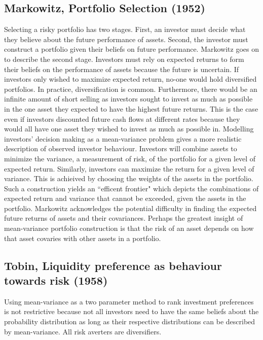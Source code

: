 \subsection[Markowitz, 1952]{Markowitz, Portfolio Selection
(1952)\cite{markowitz1952portfolio}}

Selecting a risky portfolio has two stages. First, an investor must decide what they
believe about the future performance of assets. Second, the investor must construct a
portfolio given their beliefs on future performance. Markowitz goes on to describe the
second stage. Investors must rely on expected returns to form their beliefs on the
performance of assets because the future is uncertain. If investors only wished to
maximize expected return, no-one would hold diversified portfolios. In practice,
diversification is common. Furthermore, there would be an infinite amount of short selling
as investors sought to invest as much as possible in the one asset they expected to have
the highest future returns. This is the case even if investors discounted future cash
flows at different rates because they would all have one asset they wished to invest as
much as possible in. Modelling investors' decision making as a mean-variance problem gives
a more realistic description of observed investor behaviour. Investors will combine assets
to minimize the variance, a measurement of risk, of the portfolio for a given level of
expected return. Similarly, investors can maximize the return for a given level of
variance. This is achieived by choosing the weights of the assets in the portfolio. Such a
construction yields an ``efficent frontier" which depicts the combinations of expected
return and variance that cannot be exceeded, given the assets in the portfolio. Markowitz
acknowledges the potential difficulty in finding the expected future returns of assets and
their covariances. Perhaps the greatest insight of mean-variance portfolio construction is
that the risk of an asset depends on how that asset covaries with other assets in a
portfolio.

\subsection[Tobin, 1958]{Tobin, Liquidity preference as behaviour towards risk
(1958)\cite{tobin1958liquidity}}

Using mean-variance as a two parameter method to rank investment preferences is not
restrictive because not all investors need to have the same beliefs about the probability
distribution as long as their respective distributions can be described by mean-variance.
All risk averters are diversifiers.

